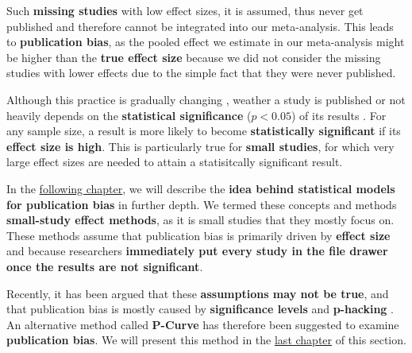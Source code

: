 \documentclass[]{book}
\begin{document}
Such \textbf{missing studies} with low effect sizes, it is assumed, thus never get published and therefore cannot be integrated into our meta-analysis. This leads to \textbf{publication bias}, as the pooled effect we estimate in our meta-analysis might be higher than the \textbf{true effect size} because we did not consider the missing studies with lower effects due to the simple fact that they were never published.

Although this practice is gradually changing \citep{nelson2018psychology}, weather a study is published or not heavily depends on the \textbf{statistical significance} (\(p<0.05\)) of its results \citep{dickersin2005publication}. For any sample size, a result is more likely to become \textbf{statistically significant} if its \textbf{effect size is high}. This is particularly true for \textbf{small studies}, for which very large effect sizes are needed to attain a statisitcally significant result.

In the \protect\hyperlink{smallstudyeffects}{following chapter}, we will describe the \textbf{idea behind statistical models for publication bias} in further depth. We termed these concepts and methods \textbf{small-study effect methods}, as it is small studies that they mostly focus on. These methods assume that publication bias is primarily driven by \textbf{effect size} and because researchers \textbf{immediately put every study in the file drawer once the results are not significant}.

Recently, it has been argued that these \textbf{assumptions may not be true}, and that publication bias is mostly caused by \textbf{significance levels} and \textbf{p-hacking} \citep{simonsohn2014p}. An alternative method called \textbf{P-Curve} has therefore been suggested to examine \textbf{publication bias}. We will present this method in the \protect\hyperlink{pcurve}{last chapter} of this section.
\end{document}
